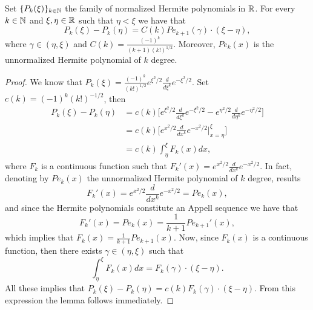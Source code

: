\documentclass[review,onefignum,onetabnum]{siamart190516}
\begin{document}
    \begin{lemma}\label{le-s3-1}
        Set $\{P_k(\xi)\}_{k\in {\mathbb N}}$ the family of normalized Hermite 
        polynomials in ${\mathbb R}$. For every $k\in{\mathbb N}$ and 
        $\xi, \eta \in {\mathbb R}$ such that
        $\eta<\xi$ we have that
        \begin{equation}
            \label{Pk-dif}
            P_k(\xi)-P_k(\eta)
                = C(k)  Pe_{k+1}(\gamma) 
                    \cdot (\xi-\eta), 
        \end{equation}
        where 
        $ \gamma\in (\eta,\xi)$ and 
        $C(k)=\frac{(-1)^k}{(k+1)(k!)^{1/2}} $.
        Moreover, $Pe_k(x)$ is the unnormalized Hermite polynomial of $k$ 
        degree.
    \end{lemma}
%
    \begin{proof}
             We know that
             $
                 P_k(\xi) = \frac{(-1)^k}{(k!)^{1/2}} 
                 e^{\xi^2/2}\frac{d}{d\xi^k}e^{-\xi^2/2}.
             $
             Set $c(k)=(-1)^k (k!)^{-1/2}$, then
            \begin{align*}
                P_k(\xi)-P_k(\eta)
                    &=c(k)
                    \Big[
                        e^{\xi^2/2}
                        \frac{d}{d\xi^k} e^{-\xi ^ 2/2} - e^{\eta^2/2}
                        \frac{d}{d\eta^k} e^{-\eta ^ 2/2}
                    \Big] 
                    \\
                & =c(k)
                    \Bigg[
                        e^{x^2/2} \frac{d}{dx^k} e^{-x^2/2}
                    \Big|_{x=\eta}^\xi\Bigg]
                    \\
                & = c(k) \int_{\eta}^\xi F_k(x) dx,
            \end{align*}
            where $F_k$ is a continuous function such that
            $F_k'(x) = e^{x^2/2}\frac{d}{dx^k}e^{-x^2/2}$. 
            In fact, denoting by $Pe_k(x)$ the
            unnormalized Hermite polynomial of $k$ degree, results
            $$
                F_k'(x)=e^{x^2/2}\frac{d}{dx^k}e^{-x^2/2}= Pe_k(x),
            $$
            and since the Hermite polynomials constitute an Appell sequence we 
            have that
            $$
                F_k'(x)=Pe_k(x)=\frac{1}{k+1} Pe_{k+1}'(x),
            $$
            which implies that $F_k(x)=\frac{1}{k+1} Pe_{k+1}(x)$. Now, since 
            $F_k(x)$ is a continuous function, then there exists
            $\gamma\in (\eta,\xi)$ such that
            $$
                \int_{\eta}^\xi F_k(x) dx = F_k(\gamma)\cdot (\xi-\eta).
            $$
            All these implies that
            $
                P_k(\xi)-P_k(\eta)= c(k) F_k(\gamma) \cdot (\xi-\eta).
            $
            From this expression the lemma follows immediately.
        \end{proof}
\end{document}
